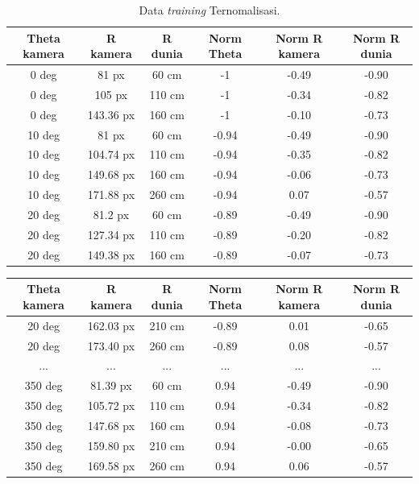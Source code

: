 \begin{longtable}{|c|c|c|c|c|c|}
  \caption{Data \textit{training} Ternomalisasi.}
  \label{tb:datatrain2}                                   \\
  \hline
  \rowcolor[HTML]{C0C0C0}
  \textbf{Theta kamera} & \textbf{R kamera} & \textbf{R dunia} & \textbf{Norm Theta} & \textbf{Norm R kamera} & \textbf{Norm R dunia} \\
  \hline
  0 deg            & 81 px                & 60 cm            & -1 & -0.49 & -0.90 \\
  0 deg            & 105 px                & 110 cm            & -1 & -0.34 & -0.82 \\
  0 deg           & 143.36 px                & 160 cm            & -1 & -0.10 & -0.73 \\
  10 deg           & 81 px                & 60 cm           & -0.94 & -0.49 & -0.90 \\
  10 deg           & 104.74 px                & 110 cm           & -0.94 & -0.35 & -0.82 \\
  10 deg           & 149.68 px                & 160 cm           & -0.94 & -0.06 & -0.73 \\
  10 deg           & 171.88 px                & 260 cm           & -0.94 & 0.07 & -0.57 \\
  20 deg           & 81.2 px                & 60 cm           & -0.89 & -0.49 & -0.90 \\
  20 deg           & 127.34 px                & 110 cm           & -0.89 & -0.20 & -0.82 \\
  20 deg           & 149.38 px                & 160 cm           & -0.89 & -0.07 & -0.73 \\
  \hline

\end{longtable}

\begin{longtable}{|c|c|c|c|c|c|}
  \hline
  \rowcolor[HTML]{C0C0C0}
  \textbf{Theta kamera} & \textbf{R kamera} & \textbf{R dunia} & \textbf{Norm Theta} & \textbf{Norm R kamera} & \textbf{Norm R dunia} \\
  \hline
  20 deg           & 162.03 px                & 210 cm           & -0.89 & 0.01 & -0.65 \\
  20 deg           & 173.40 px                & 260 cm           & -0.89 & 0.08 & -0.57 \\
  ...           & ...                & ...           & ... & ... & ... \\
  350 deg           & 81.39 px                & 60 cm           & 0.94 & -0.49 & -0.90 \\
  350 deg           & 105.72 px                & 110 cm           & 0.94 & -0.34 & -0.82 \\
  350 deg           & 147.68 px                & 160 cm           & 0.94 & -0.08 & -0.73 \\
  350 deg           & 159.80 px                & 210 cm           & 0.94 & -0.00 & -0.65 \\
  350 deg           & 169.58 px                & 260 cm           & 0.94 & 0.06 & -0.57 \\
  \hline
\end{longtable}

